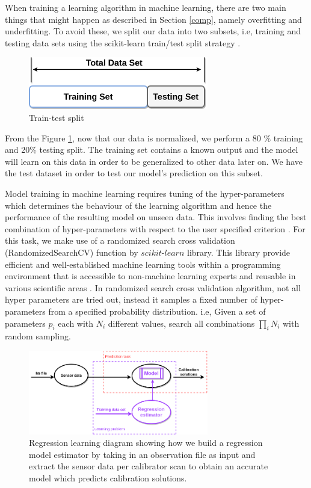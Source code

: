 When training a learning algorithm  in machine learning, there are two main things that might happen as described in Section \ref{comp}, namely overfitting and underfitting. To avoid these, we split our data into two subsets, i.e, training and testing data sets using the scikit-learn train/test split strategy \citep{buitinck2013api}. 

  \begin{figure}[H]
  \centering
    \includegraphics[width=0.7\textwidth]{images/t_s.png}
    \caption{Train-test split}
  \label{ts}
\end{figure}

From the Figure \ref{ts}, now that our data is normalized, we perform a 80 $\%$ training and 20$\%$ testing split. The training set contains a known output and the model will learn on this data in order to be generalized to other data later on. We have the test dataset in order to test our model's prediction on this subset.
 
Model training in machine learning requires tuning of the  hyper-parameters which determines the behaviour of the learning algorithm and hence the performance
of the resulting model on unseen data. This involves finding the best combination of hyper-parameters with respect to the user specified criterion \citep{buitinck2013api}. For this task, we make use of a randomized search cross validation (RandomizedSearchCV) function by $\textit{scikit-learn}$ library. This library provide efficient and well-established machine learning tools within
a programming environment that is accessible to non-machine learning experts and reusable in various scientific areas \citep{buitinck2013api}. In randomized search cross validation algorithm, not all hyper parameters are tried out, instead it samples a fixed number of hyper-parameters from a specified probability distribution. i.e, Given a set of parameters $p_i$ each with $N_i$ different values, search all combinations $\prod_i N_i$ with random sampling.


   \begin{figure}[H]
  \centering
    \includegraphics[width=0.7\textwidth]{images/RegressionEST.png}
    \caption{Regression learning diagram showing how we build a regression model estimator by taking in an observation file as input and extract the sensor data per calibrator scan to obtain an accurate model which predicts calibration solutions.}
  \label{DD}
  \end{figure} 


